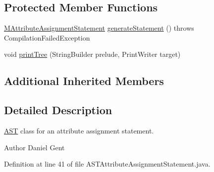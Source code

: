 \subsection*{Protected Member Functions}
\begin{DoxyCompactItemize}
\item 
\hyperlink{classorg_1_1tzi_1_1use_1_1uml_1_1sys_1_1soil_1_1_m_attribute_assignment_statement}{M\-Attribute\-Assignment\-Statement} \hyperlink{classorg_1_1tzi_1_1use_1_1parser_1_1soil_1_1ast_1_1_a_s_t_attribute_assignment_statement_a91e8bc8d759ea65f8dfd32a6e89a2a61}{generate\-Statement} ()  throws Compilation\-Failed\-Exception 
\item 
void \hyperlink{classorg_1_1tzi_1_1use_1_1parser_1_1soil_1_1ast_1_1_a_s_t_attribute_assignment_statement_ae4fad06ee4f15565a5d42d3df62dd08b}{print\-Tree} (String\-Builder prelude, Print\-Writer target)
\end{DoxyCompactItemize}
\subsection*{Additional Inherited Members}


\subsection{Detailed Description}
\hyperlink{classorg_1_1tzi_1_1use_1_1parser_1_1_a_s_t}{A\-S\-T} class for an attribute assignment statement. \begin{DoxyAuthor}{Author}
Daniel Gent 
\end{DoxyAuthor}


Definition at line 41 of file A\-S\-T\-Attribute\-Assignment\-Statement.\-java.



